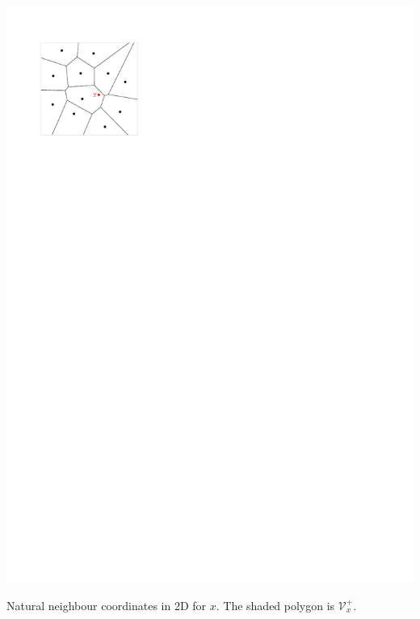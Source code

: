 \begin{marginfigure}
  \centering
  \includegraphics[width=\textwidth,page=2]{figs/laplace.pdf}%
  \caption{Natural neighbour coordinates in 2D for $x$. The shaded polygon is $\mathcal{V}^{+}_{x}$. }%
\end{marginfigure}

